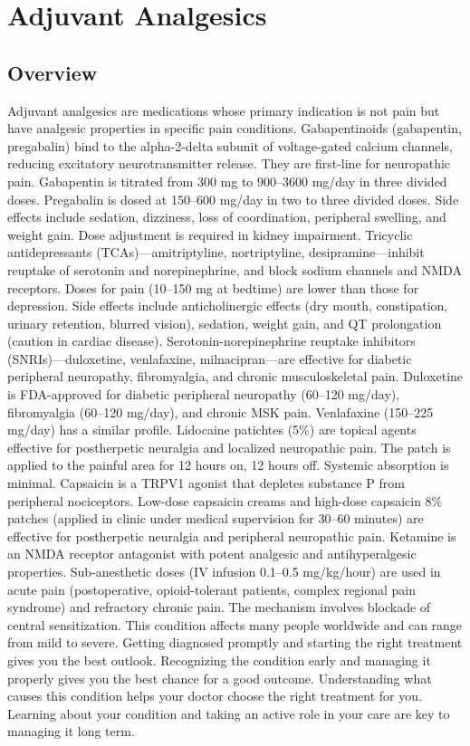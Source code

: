 \chapter{Adjuvant Analgesics}
\label{sec:Adjuvant Analgesics}

\section{Overview}
Adjuvant analgesics are medications whose primary indication is not pain but have analgesic properties in specific pain conditions. Gabapentinoids (gabapentin, pregabalin) bind to the alpha-2-delta subunit of voltage-gated calcium channels, reducing excitatory neurotransmitter release. They are first-line for neuropathic pain. Gabapentin is titrated from 300 mg to 900--3600 mg/day in three divided doses. Pregabalin is dosed at 150--600 mg/day in two to three divided doses. Side effects include sedation, dizziness, loss of coordination, peripheral swelling, and weight gain. Dose adjustment is required in kidney impairment. Tricyclic antidepressants (TCAs)---amitriptyline, nortriptyline, desipramine---inhibit reuptake of serotonin and norepinephrine, and block sodium channels and NMDA receptors. Doses for pain (10--150 mg at bedtime) are lower than those for depression. Side effects include anticholinergic effects (dry mouth, constipation, urinary retention, blurred vision), sedation, weight gain, and QT prolongation (caution in cardiac disease). Serotonin-norepinephrine reuptake inhibitors (SNRIs)---duloxetine, venlafaxine, milnacipran---are effective for diabetic peripheral neuropathy, fibromyalgia, and chronic musculoskeletal pain. Duloxetine is FDA-approved for diabetic peripheral neuropathy (60--120 mg/day), fibromyalgia (60--120 mg/day), and chronic MSK pain. Venlafaxine (150--225 mg/day) has a similar profile. Lidocaine patichtes (5\%) are topical agents effective for postherpetic neuralgia and localized neuropathic pain. The patch is applied to the painful area for 12 hours on, 12 hours off. Systemic absorption is minimal. Capsaicin is a TRPV1 agonist that depletes substance P from peripheral nociceptors. Low-dose capsaicin creams and high-dose capsaicin 8\% patches (applied in clinic under medical supervision for 30--60 minutes) are effective for postherpetic neuralgia and peripheral neuropathic pain. Ketamine is an NMDA receptor antagonist with potent analgesic and antihyperalgesic properties. Sub-anesthetic doses (IV infusion 0.1--0.5 mg/kg/hour) are used in acute pain (postoperative, opioid-tolerant patients, complex regional pain syndrome) and refractory chronic pain. The mechanism involves blockade of central sensitization. This condition affects many people worldwide and can range from mild to severe. Getting diagnosed promptly and starting the right treatment gives you the best outlook. Recognizing the condition early and managing it properly gives you the best chance for a good outcome. Understanding what causes this condition helps your doctor choose the right treatment for you. Learning about your condition and taking an active role in your care are key to managing it long term.

